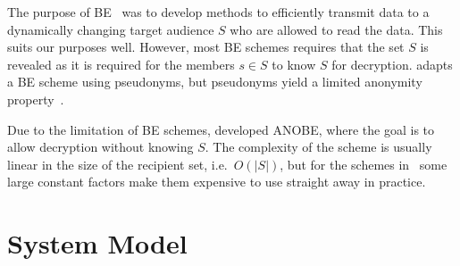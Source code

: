 The purpose of \ac{BE}~\cite{broadcastenc} was to develop methods to 
efficiently transmit data to a dynamically changing target audience \(S\) who 
are allowed to read the data.
This suits our purposes well.
However, most \ac{BE} schemes requires that the set \(S\) is revealed as it is 
required for the members \(s\in S\) to know \(S\) for decryption.
\citet{gunther2012cryptographic} adapts a \ac{BE} scheme using pseudonyms, but 
pseudonyms yield a limited anonymity property~\cite{gunther2012cryptographic}.

Due to the limitation of \ac{BE} schemes, \citet{anobe} developed \ac{ANOBE}, 
where the goal is to allow decryption without knowing \(S\).
The complexity of the scheme is usually linear in the size of the recipient 
set, i.e.~\(O(|S|)\), but for the schemes in~\cite{anobe} some large constant 
factors make them expensive to use straight away in practice.


\section{System Model}\label{sec:SystemModel}

